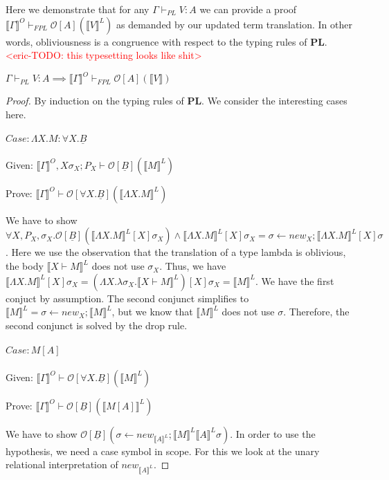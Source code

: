 \documentclass[acmsmall]{acmart}
\newcommand{\den}[1]{\llbracket #1\rrbracket}
\newcommand{\eric}[1]{\textcolor{red}{ <eric-#1> }}
\newcommand{\pl}{$\mathbf{PL}$}
\begin{document}
Here we demonstrate that for any $\Gamma \vdash_{PL} V : A$ we can provide a proof $\den{\Gamma}^O \vdash_{FPL} \mathcal{O}[A](\den{V}^L)$ as demanded by our updated term translation. In other words, obliviousness is a congruence with respect to the typing rules of \pl.
\eric{TODO: this typesetting looks like shit}
\begin{lemma}
  \label{lem:OblivTerm}
  $\Gamma \vdash_{PL} V : A \implies \den{\Gamma}^O \vdash_{FPL} \mathcal{O}[A](\den{V})$
\end{lemma}
\begin{proof}
  By induction on the typing rules of $\mathbf{PL}$. We consider the interesting cases here.
  \paragraph{$Case: \Lambda X. M : \forall X. \underline{B}$}
  \indent

  \quad Given: $\den{\Gamma}^O,X\sigma_X;P_X \vdash \mathcal{O}[\underline{B}](\den{M}^L)$

  \quad Prove: $\den{\Gamma}^O \vdash \mathcal{O}[\forall X. \underline{B}](\den{\Lambda X. M}^L)$

  We have to show $\forall X,P_X,\sigma_X.\mathcal{O}[\underline{B}](\den{\Lambda X.M}^L[X]\sigma_X) \land \den{\Lambda X. M}^L[X]\sigma_X = \sigma \leftarrow new_X;\den{\Lambda X. M}^L[X]\sigma$.
  Here we use the observation that the translation of a type lambda is oblivious, the body $\den{X \vdash M}^L$ does not use $\sigma_X.$ Thus, we have $\den{\Lambda X. M}^L[X]\sigma_X = (\Lambda X.\lambda \sigma_X.\den{X \vdash M}^L)[X]\sigma_X = \den{M}^L$. We have the first conjuct by assumption. The second conjunct simplifies to $\den{M}^L = \sigma \leftarrow new_X; \den{M}^L$, but we know that $\den{M}^L$ does not use $\sigma$. Therefore, the second conjunct is solved by the drop rule.

  \paragraph{$Case: M[A]$}
  \indent

  \quad Given: $\den{\Gamma}^O \vdash \mathcal{O}[\forall X. \underline{B}](\den{M}^L)$
  
  \quad Prove: $\den{\Gamma}^O \vdash \mathcal{O}[\underline{B}](\den{M[A]}^L)$

  We have to show $\mathcal{O}[\underline{B}](\sigma \leftarrow new_{\den{A}^L};\den{M}^L\den{A}^L\sigma)$. In order to use the hypothesis, we need a case symbol in scope. For this we look at the unary relational interpretation of $new_{\den{A}^L}$.


\end{proof}
\end{document}

